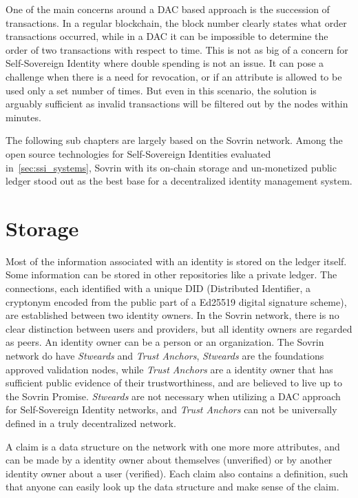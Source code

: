One of the main concerns around a DAC based approach is the succession of transactions. In a regular blockchain, the block number clearly states what order transactions occurred, while in a DAC it can be impossible to determine the order of two transactions with respect to time. This is not as big of a concern for Self-Sovereign Identity where double spending is not an issue. It can pose a challenge when there is a need for revocation, or if an attribute is allowed to be used only a set number of times. But even in this scenario, the solution is arguably sufficient as invalid transactions will be filtered out by the nodes within minutes.

\newpage
The following sub chapters are largely based on the Sovrin network. Among the open source technologies for Self-Sovereign Identities evaluated in~\ref{sec:ssi_systems}, Sovrin with its on-chain storage and un-monetized public ledger stood out as the best base for a decentralized identity management system.

\section{Storage}
Most of the information associated with an identity is stored on the ledger itself. Some information can be stored in other repositories like a private ledger. The connections, each identified with a unique DID (Distributed Identifier, a cryptonym encoded from the public part of a Ed25519 digital signature scheme), are established between two identity owners. In the Sovrin network, there is no clear distinction between users and providers, but all identity owners are regarded as peers. An identity owner can be a person or an organization. The Sovrin network do have \textit{Stweards} and \textit{Trust Anchors}, \textit{Stweards} are the foundations approved validation nodes, while \textit{Trust Anchors} are a identity owner that has sufficient public evidence of their trustworthiness, and are believed to live up to the Sovrin Promise. \textit{Stweards} are not necessary when utilizing a DAC approach for Self-Sovereign Identity networks, and \textit{Trust Anchors} can not be universally defined in a truly decentralized network. 

A claim is a data structure on the network with one more more attributes, and can be made by a identity owner about themselves (unverified) or by another identity owner about a user (verified). Each claim also contains a definition, such that anyone can easily look up the data structure and make sense of the claim.

